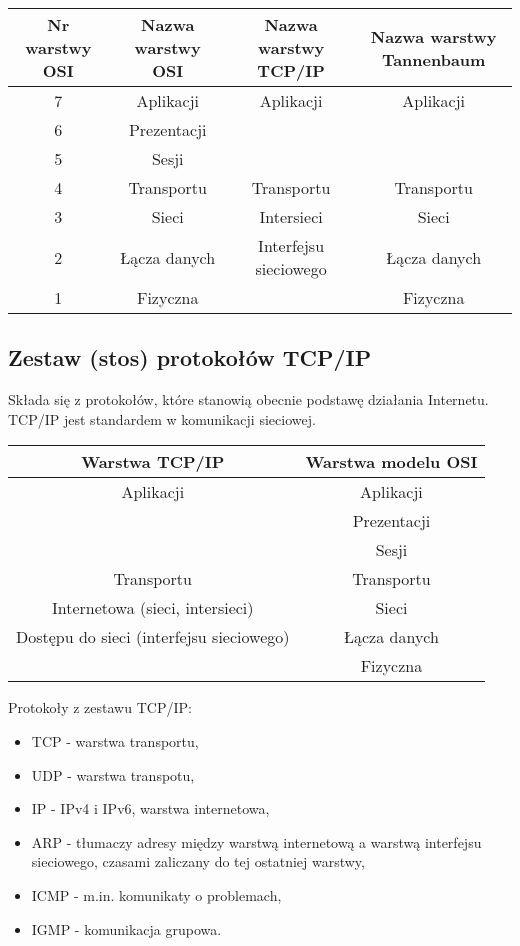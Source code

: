 \documentclass[a4paper]{article}
\begin{document}
\begin{tabular}{|c|c|c|c| }
\hline
Nr warstwy OSI & Nazwa warstwy OSI & Nazwa warstwy TCP/IP & Nazwa warstwy Tannenbaum\\
\hline
7 & Aplikacji & Aplikacji & Aplikacji\\
6 & Prezentacji & & \\
5 & Sesji & & \\
4 & Transportu & Transportu & Transportu\\
3 & Sieci & Intersieci & Sieci\\
2 & Łącza danych & Interfejsu sieciowego & Łącza danych\\
1 & Fizyczna & & Fizyczna\\
\hline
\end{tabular}

\subsection{Zestaw (stos) protokołów TCP/IP}
Składa się z protokołów, które stanowią obecnie podstawę działania Internetu. TCP/IP jest standardem w komunikacji sieciowej.

\begin{tabular}{|c|c|}
    \hline
    Warstwa TCP/IP & Warstwa modelu OSI\\
    \hline
    Aplikacji & Aplikacji\\
    & Prezentacji\\
    & Sesji\\
    \hline
    Transportu & Transportu\\
    \hline
    Internetowa (sieci, intersieci) & Sieci\\
    \hline
    Dostępu do sieci (interfejsu
    sieciowego) & Łącza danych\\
    & Fizyczna\\
    \hline
\end{tabular}

Protokoły z zestawu TCP/IP:
\begin{itemize}
    \item TCP - warstwa transportu,
    \item UDP - warstwa transpotu,
    \item IP - IPv4 i IPv6, warstwa internetowa,
    \item ARP - tłumaczy adresy między warstwą internetową a warstwą interfejsu
    sieciowego, czasami zaliczany do tej ostatniej warstwy,
    \item ICMP - m.in. komunikaty o problemach,
    \item IGMP - komunikacja grupowa.
\end{itemize}
\end{document}
